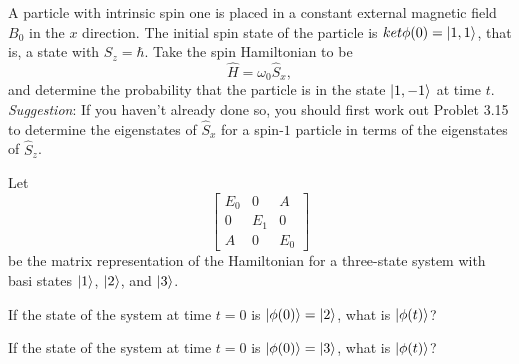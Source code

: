 \documentclass{../phys116}
\begin{document}
\begin{exercise}
  A particle with intrinsic spin one is placed in a constant external
  magnetic field \(B_0\) in the \(x\) direction.  The initial spin
  state of the particle is \(ket{\phi(0)} = \lvert1, 1\rangle\), that is, a
  state with \(S_z = \hbar\).  Take the spin Hamiltonian to be
  \[
    \hat H = \omega_0 \hat S_x,
  \]
  and determine the probability that the particle is in the state
  \(\lvert1, -1\rangle\) at time \(t\).  \textit{Suggestion}: If you haven't
  already done so, you should first work out Problet 3.15 to determine
  the eigenstates of \(\hat S_x\) for a spin-\(1\) particle in terms
  of the eigenstates of \(\hat S_z\).
\end{exercise}

\begin{solution}

\end{solution}

\begin{exercise}
  Let
  \[
    \begin{bmatrix}
      E_0 & 0   & A \\
      0   & E_1 & 0 \\
      A   & 0   & E_0
    \end{bmatrix}
  \]
  be the matrix representation of the Hamiltonian for a three-state
  system with basi states \(\lvert1\rangle\), \(\lvert2\rangle\), and \(\lvert3\rangle\).
  \begin{problems}
  \item If the state of the system at time \(t=0\) is
    \(\lvert\phi(0)\rangle = \lvert2\rangle\), what is \(\lvert\phi(t)\rangle\)?
  \item If the state of the system at time \(t=0\) is
    \(\lvert\phi(0)\rangle = \lvert3\rangle\), what is \(\lvert\phi(t)\rangle\)?
  \end{problems}
\end{exercise}

\begin{solution}
  \begin{problems}
  \item
  \item
  \end{problems}
\end{solution}
\end{document}
